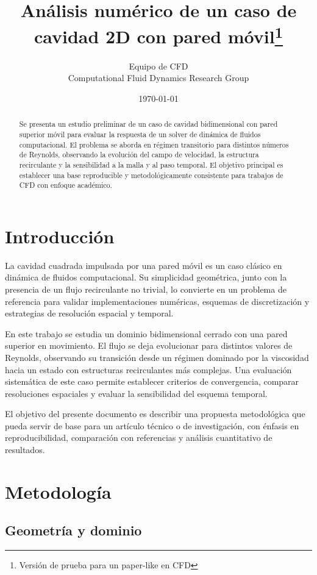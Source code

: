 \documentclass[11pt]{article}
\title{Análisis numérico de un caso de cavidad 2D con pared móvil\thanks{Versión de prueba para un paper-like en CFD}}
\author{Equipo de CFD\\
\small{Computational Fluid Dynamics Research Group}}
\date{\today}
\begin{document}
\maketitle

\begin{abstract}
Se presenta un estudio preliminar de un caso de cavidad bidimensional con pared superior móvil para evaluar la respuesta de un solver de dinámica de fluidos computacional. El problema se aborda en régimen transitorio para distintos números de Reynolds, observando la evolución del campo de velocidad, la estructura recirculante y la sensibilidad a la malla y al paso temporal. El objetivo principal es establecer una base reproducible y metodológicamente consistente para trabajos de CFD con enfoque académico.
\end{abstract}

\section{Introducción}

La cavidad cuadrada impulsada por una pared móvil es un caso clásico en dinámica de fluidos computacional. Su simplicidad geométrica, junto con la presencia de un flujo recirculante no trivial, lo convierte en un problema de referencia para validar implementaciones numéricas, esquemas de discretización y estrategias de resolución espacial y temporal.

En este trabajo se estudia un dominio bidimensional cerrado con una pared superior en movimiento. El flujo se deja evolucionar para distintos valores de Reynolds, observando su transición desde un régimen dominado por la viscosidad hacia un estado con estructuras recirculantes más complejas. Una evaluación sistemática de este caso permite establecer criterios de convergencia, comparar resoluciones espaciales y evaluar la sensibilidad del esquema temporal.

El objetivo del presente documento es describir una propuesta metodológica que pueda servir de base para un artículo técnico o de investigación, con énfasis en reproducibilidad, comparación con referencias y análisis cuantitativo de resultados.

\section{Metodología}

\subsection{Geometría y dominio}
\end{document}
